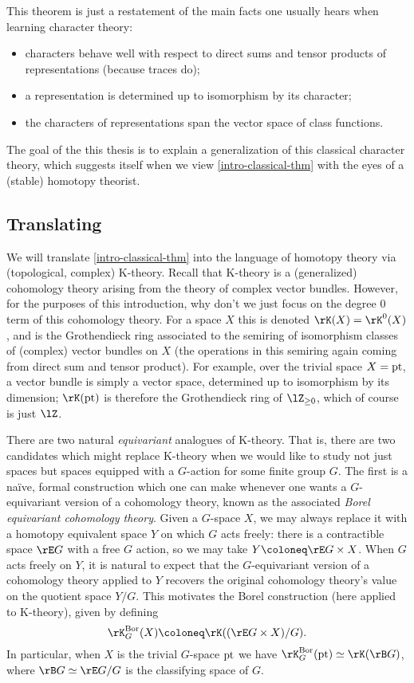 This theorem is just a restatement of the main facts one usually hears
when learning character theory:
\begin{itemize}
\item characters behave well with respect to direct sums and tensor
  products of representations (because traces do);
\item a representation is determined up to isomorphism by its
  character;
\item the characters of representations span the vector space of class
  functions.
\end{itemize}

The goal of the this thesis is to explain a generalization of this
classical character theory, which suggests itself when we view
\cref{intro-classical-thm} with the eyes of a (stable) homotopy
theorist.


\subsection{Translating}
\label{intro-trans}

We will translate \cref{intro-classical-thm} into the language of
homotopy theory via (topological, complex) K-theory. Recall that
K-theory is a (generalized) cohomology theory arising from the theory
of complex vector bundles. However, for the purposes of this
introduction, why don't we just focus on the degree $0$ term of this
cohomology theory. For a space $X$ this is denoted
$\rK(X) = \rK^0(X)$, and is the Grothendieck ring associated to the
semiring of isomorphism classes of (complex) vector bundles on $X$
(the operations in this semiring again coming from direct sum and
tensor product). For example, over the trivial space $X = \mathrm{pt}$, a
vector bundle is simply a vector space, determined up to isomorphism
by its dimension; $\rK(\pt)$ is therefore the Grothendieck ring of
$\lZ_{\ge 0}$, which of course is just $\lZ$.

There are two natural \emph{equivariant} analogues of K-theory. That
is, there are two candidates which might replace K-theory when we
would like to study not just spaces but spaces equipped with a
$G$-action for some finite group $G$. The first is a na\"ive, formal
construction which one can make whenever one wants a $G$-equivariant
version of a cohomology theory, known as the associated \emph{Borel
  equivariant cohomology theory}. Given a $G$-space $X$, we may always
replace it with a homotopy equivalent space $Y$ on which $G$ acts
freely: there is a contractible space $\rE G$ with a free $G$ action,
so we may take $Y \ce \rE G \times X$. When $G$ acts freely on $Y$, it
is natural to expect that the $G$-equivariant version of a cohomology
theory applied to $Y$ recovers the original cohomology theory's value
on the quotient space $Y/G$. This motivates the Borel construction
(here applied to K-theory), given by defining
\[
\rK^\Bor_G(X) \ce \rK((\rE G \times X)/G).
\]
In particular, when $X$ is the trivial $G$-space $\mathrm{pt}$ we have
$\rK^\Bor_G(\pt) \iso \rK(\rB G)$, where $\rB G \iso \rE G / G$ is the
classifying space of $G$.

